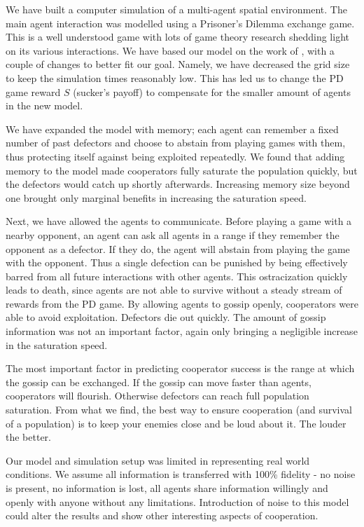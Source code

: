 \documentclass[english]{article}
\begin{document}
We have built a computer simulation of a multi-agent spatial environment.
The main agent interaction was modelled using a Prisoner's Dilemma exchange game. This is a well understood game with lots of game theory research shedding light on its various interactions.
We have based our model on the work of \citet{smaldino}, with a couple of changes to better fit our goal.
Namely, we have decreased the grid size to keep the simulation times reasonably low.
This has led us to change the PD game reward $S$ (sucker's payoff) to compensate for the smaller amount of agents in the new model.

We have expanded the model with memory; each agent can remember a fixed number of past defectors and choose to abstain from playing games with them, thus protecting itself against being exploited repeatedly.
We found that adding memory to the model made cooperators fully saturate the population quickly, but the defectors would catch up shortly afterwards.
Increasing memory size beyond one brought only marginal benefits in increasing the saturation speed.

Next, we have allowed the agents to communicate. Before playing a game with a nearby opponent, an agent can ask all agents in a range if they remember the opponent as a defector. If they do, the agent will abstain from playing the game with the opponent.
Thus a single defection can be punished by being effectively barred from all future interactions with other agents.
This ostracization quickly leads to death, since agents are not able to survive without a steady stream of rewards from the PD game.
By allowing agents to gossip openly, cooperators were able to avoid exploitation. Defectors die out quickly.
The amount of gossip information was not an important factor, again only bringing a negligible increase in the saturation speed.

The most important factor in predicting cooperator success is the range at which the gossip can be exchanged.
If the gossip can move faster than agents, cooperators will flourish.  Otherwise defectors can reach full population saturation.
From what we find, the best way to ensure cooperation (and survival of a population) is to keep your enemies close and be loud about it.
The louder the better.

Our model and simulation setup was limited in representing real world conditions.
We assume all information is transferred with 100\% fidelity - no noise is present, no information is lost, all agents share information willingly and openly with anyone without any limitations. Introduction of noise to this model could alter the results and show other interesting aspects of cooperation.
\end{document}
